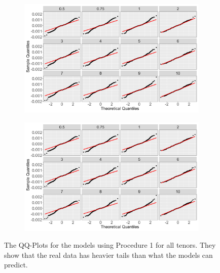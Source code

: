 \begin{figure}[!htbp]
    \centering
    \captionsetup{type=figure}
    \begin{subfigure}{0.49\textwidth}
        \centering
        \captionsetup{justification=centering}
        \includegraphics[width=\textwidth]{Figures/Model Checking/zero_coupon_yields_phase_3_HJM_2F_procedure_1_poly_model_qq_plot.png}
        \label{fig:qq poly model p 1}
    \end{subfigure}
    \hfill
    \begin{subfigure}{0.49\textwidth}
        \centering
        \captionsetup{justification=centering}
        \includegraphics[width=\textwidth]{Figures/Model Checking/zero_coupon_yields_phase_3_HJM_2F_procedure_1_spline_model_qq_plot.png}
        \label{fig:qq spline model p 1}
    \end{subfigure}
    \caption[The QQ-Plots for the models using Procedure 1 for all tenors.]{The QQ-Plots for the models using Procedure 1 for all tenors. They show that the real data has heavier tails than what the models can predict.}
    \label{fig:qq p 1}
\end{figure}

